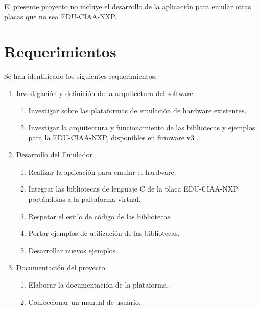 El presente proyecto no incluye el desarrollo de la aplicación para emular otras placas que no sea EDU-CIAA-NXP.

\section{Requerimientos}
\label{sec:Requerimientos}

Se han identificado los siguientes requerimientos:

\begin{enumerate}
    \item Investigación y definición de la arquitectura del software.
        \begin{enumerate}
            \item Investigar sobre las plataformas de emulación de hardware existentes.
            \item Investigar la arquitectura y funcionamiento de las bibliotecas y ejemplos para la EDU-CIAA-NXP, disponibles en firmware v3 \citep{firmwareV3}.
        \end{enumerate}
    \item Desarrollo del Emulador.
        \begin{enumerate}
            \item Realizar la aplicación para emular el hardware.
            \item Integrar las bibliotecas de lenguaje C de la placa EDU-CIAA-NXP portándolas a la paltaforma virtual.
            \item Respetar el estilo de código de las bibliotecas.
            \item Portar ejemplos de utilización de las bibliotecas.
            \item Desarrollar nuevos ejemplos.
        \end{enumerate}
    \item Documentación del proyecto.
        \begin{enumerate}
            \item Elaborar la documentación de la plataforma.
            \item Confeccionar un manual de usuario.
        \end{enumerate}
\end{enumerate}

